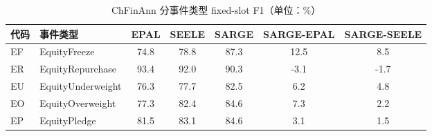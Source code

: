 \begin{table}[htbp]
\centering
\caption{ChFinAnn 分事件类型 fixed-slot F1（单位：\%）}
\label{tab:chfinann-events}
\small
\begin{tabular}{llSSSSS}
\toprule
代码 & 事件类型 & {EPAL} & {SEELE} & {SARGE} & {SARGE-EPAL} & {SARGE-SEELE} \\
\midrule
EF & EquityFreeze & 74.8 & 78.8 & 87.3 & 12.5 & 8.5 \\
ER & EquityRepurchase & 93.4 & 92.0 & 90.3 & -3.1 & -1.7 \\
EU & EquityUnderweight & 76.3 & 77.7 & 82.5 & 6.2 & 4.8 \\
EO & EquityOverweight & 77.3 & 82.4 & 84.6 & 7.3 & 2.2 \\
EP & EquityPledge & 81.5 & 83.1 & 84.6 & 3.1 & 1.5 \\
\bottomrule
\end{tabular}
\end{table}
